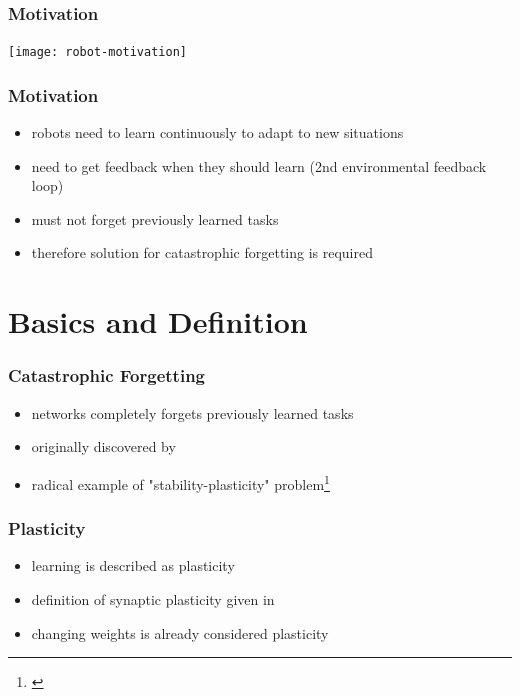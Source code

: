 \documentclass[14pt]{beamer}
\institute{Universit\"at Hamburg\\\trinstitute}
\title{\trtitle}
\subtitle{\trtype}
\author{\trauthor}
\date{}
\theoremstyle{remark}
\begin{document}
\renewcommand{\arraystretch}{1.2}

\begin{frame}[plain] %
  \titlepage
\end{frame}

\begin{frame}[t]
    \frametitle{Motivation}
    \centering
    \texttt{[image: robot-motivation]}
\end{frame}

\begin{frame}[t]
    \frametitle{Motivation}
    \begin{itemize}
  	    \item robots need to learn continuously to adapt to new situations
        \vfill
        \item need to get feedback when they should learn (2nd environmental
              feedback loop)
        \vfill
        \item must not forget previously learned tasks
        \vfill
        \item therefore solution for catastrophic forgetting is required
	\end{itemize}
\end{frame}



\section{Basics and Definition}

\begin{frame}[t]
    \frametitle{Catastrophic Forgetting}
    \begin{itemize}
  	    \item networks completely forgets previously learned tasks
        \vfill
        \item originally discovered by \cite{McCloskey1989}
        \vfill
        \item radical example of "stability-plasticity" problem\footnote{\cite{Grossberg1982}}
	\end{itemize}
\end{frame}

\begin{frame}[t]
    \frametitle{Plasticity}
    \begin{itemize}
  	    \item learning is described as plasticity
        \vfill
        \item definition of synaptic plasticity given in \cite{Citri2008}
        \vfill
        \item changing weights is already considered plasticity
	\end{itemize}
\end{frame}
\end{document}
